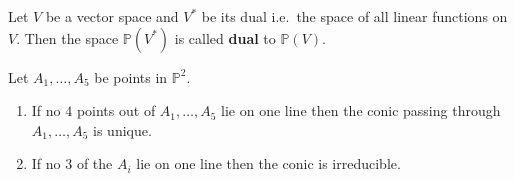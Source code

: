 \documentclass[12pt, a4paper]{article}
\newcommand{\PP}{\mathbb P}
\begin{document}
\begin{definition}
    Let \(V\) be a vector space and \(V^*\) be its dual i.e.\ the space of all linear functions on \(V\). Then the space \(\PP(V^*)\) is called \textbf{dual} to \(\PP(V)\).
\end{definition}

\begin{mdprop}
    Let \(A_1,\ldots,A_5\) be points in \(\PP^2\).
    \begin{enumerate}
        \item If no \(4\) points out of \(A_1,\ldots,A_5\) lie on one line then the conic passing through \(A_1,\ldots,A_5\) is unique.
        \item If no \(3\) of the \(A_i\) lie on one line then the conic is irreducible.
    \end{enumerate}
\end{mdprop}
\end{document}
